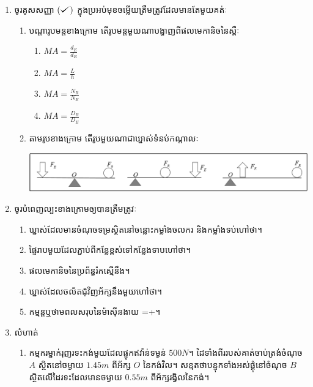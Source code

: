 \documentclass{officialexam}
\begin{document}
\begin{enumerate}[I]
	\item {\color{khtug}\sffamily ចូរគូសសញ្ញា $\left(\tick\right)$ ក្នុងប្រអប់មុខចម្លើយត្រឹមត្រូវដែលមានតែមួយគត់ៈ}
	\begin{enumerate}[m]
		\item បណ្តារូបមន្តខាងក្រោម តើរូបមន្តមួយណាបង្ហាញពីផលមេកានិចនៃស្ពឺៈ
		\begin{multicols}{4}
			\begin{enumerate}[bk]
				\item $MA=\frac{d_{E}}{d_{R}}$
				\item $MA=\frac{L}{h}$
				\item $MA=\frac{N_{R}}{N_{E}}$
				\item $MA=\frac{D_{R}}{D_{E}}$
			\end{enumerate}
		\end{multicols}
	\item តាមរូបខាងក្រោម តើរូបមួយណាជាឃ្នាស់ទំនប់កណ្តាលៈ\\
		\begin{center}
			\includegraphics[scale=0.6]{17}
		\end{center}
	\end{enumerate}
	\item {\color{khtug}\sffamily ចូរបំពេញល្បះខាងក្រោមឲ្យបានត្រឹមត្រូវៈ}
	\begin{enumerate}[m]
		\item ឃ្នាស់ដែលមានចំណុចទម្រស្ថិតនៅចន្លោះកម្លាំងចលករ និងកម្លាំងទប់ហៅថា\dotfill។
		\item ផ្ទៃរាបមួយដែលភ្ជាប់ពីកន្លែខ្ពស់ទៅកន្លែងទាបហៅថា\dotfill។
		\item ផលមេកានិចនៃប្រព័ន្ធរ៉កស្មើនឹង\dotfill។
		\item ឃ្នាស់ដែលចល័តជុំវិញអ័ក្សនឹងមួយហៅថា\dotfill។
		\item កម្មន្តឬថាមពលសរុបនៃម៉ាសុីនងាយ =\dotfill+\dotfill។
	\end{enumerate}
	\item {\color{khtug}\sffamily លំហាត់}
	\begin{enumerate}[m]
			\item កម្មករម្នាក់រុញរទះកង់មួយដែលផ្ទុកឥវ៉ាន់ទម្ងន់ $500N$។ ដៃទាំងពីររបស់គាត់ចាប់ត្រង់ចំណុច $A$ ស្ថិតនៅចម្ងាយ $1.45m$ ពីអ័ក្ស $O$ នៃកង់វិល។ សន្មតថាបន្ទុកទាំងអស់ផ្គុំនៅចំណុច $B$ ស្ថិតលើដៃរទះដែលមានចម្ងាយ $0.55m$ ពីអ័ក្សរង្វិលនៃកង់។

\end{enumerate}
\end{enumerate}
\end{document}

